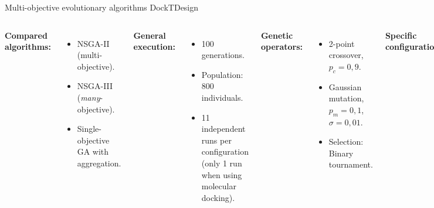 \documentclass[aspectratio=169,xcolor=dvipsnames]{beamer}
\begin{document}
\begin{frame}{Multi-objective evolutionary algorithms \hfill {\footnotesize \alert{DockTDesign}}}
    \begin{columns}[t]
        \textbf{Compared algorithms:}
        \begin{itemize}
            \item NSGA-II (multi-objective).
            \item NSGA-III (\textit{many}-objective).
            \item Single-objective GA with aggregation.
        \end{itemize}

        \vspace{0.75em}
        \textbf{General execution:}
        \begin{itemize}
            \item 100 generations.
            \item Population: 800 individuals.
            \item 11 independent runs per configuration (only 1 run when using molecular docking).
        \end{itemize}

        \textbf{Genetic operators:}
        \begin{itemize}
            \item 2-point crossover, $p_c = 0{,}9$.
            \item Gaussian mutation, $p_m = 0{,}1$, $\sigma = 0{,}01$.
            \item Selection: Binary tournament.
        \end{itemize}

        \vspace{0.75em}
        \textbf{Specific configurations:}
        \begin{itemize}
            \item NSGA-III: reference directions via Das-Dennis method (num. equal to population size).
            \item Single-objective GA: 5 weight combinations $(0.6, 0.1, 0.1, 0.1, 0.1)$ to $(0.1, 0.1, 0.1, 0.1, 0.6)$.
        \end{itemize}
    \end{columns}
\end{frame}
\end{document}
